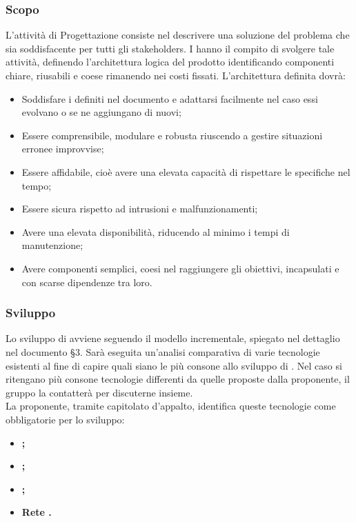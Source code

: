 \documentclass[NormeDiProgetto.tex]{subfiles}
\begin{document}
\subsubsection{Scopo}
L'attività di Progettazione consiste nel descrivere una soluzione del problema
che sia soddisfacente per tutti gli stakeholders.
I \progi hanno il compito di svolgere tale attività, definendo l'architettura logica del prodotto identificando componenti chiare, riusabili e coese rimanendo nei costi fissati. L'architettura definita dovrà:
\begin{itemize}
	\item Soddisfare i  definiti nel documento \adr e adattarsi facilmente nel caso essi evolvano o se ne aggiungano di nuovi; 
	\item Essere comprensibile, modulare e robusta riuscendo a gestire situazioni erronee improvvise;
	\item Essere affidabile, cioè avere una elevata capacità di rispettare le specifiche nel tempo;
	\item Essere sicura rispetto ad intrusioni e malfunzionamenti;
	\item Avere una elevata disponibilità, riducendo al minimo i tempi di manutenzione;
	\item Avere componenti semplici, coesi nel raggiungere gli obiettivi, incapsulati e con scarse dipendenze tra loro.
\end{itemize}

\subsubsection{Sviluppo}
Lo sviluppo di \progetto avviene seguendo il modello incrementale, spiegato nel dettaglio nel documento \pdp \S 3. Sarà eseguita un'analisi comparativa di varie tecnologie esistenti al fine di capire quali siano le più consone allo sviluppo di \progetto. Nel caso si ritengano più consone tecnologie differenti da quelle proposte dalla proponente, il gruppo \gruppo la contatterà per discuterne insieme.\\
La proponente, tramite capitolato d'appalto, identifica queste tecnologie come obbligatorie per lo sviluppo:\\
\begin{itemize}
	\item \textbf{;}
	\item \textbf{;}
	\item \textbf{;}
	\item \textbf{Rete .}
\end{itemize}
\end{document}

